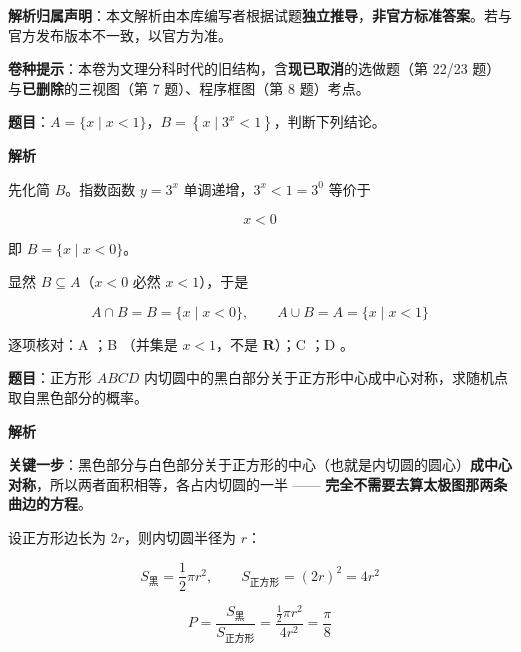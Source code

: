 

\begin{gknotice}
\textbf{ 解析归属声明}：本文解析由本库编写者根据试题\textbf{独立推导}，\textbf{非官方标准答案}。若与官方发布版本不一致，以官方为准。

\textbf{ 卷种提示}：本卷为文理分科时代的旧结构，含\textbf{现已取消}的选做题（第 22/23 题）与\textbf{已删除}的三视图（第 7 题）、程序框图（第 8 题）考点。
\end{gknotice}

\par\medskip



\textbf{题目}：$A=\{x\mid x<1\}$，$B=\left\{x\mid3^{x}<1\right\}$，判断下列结论。

\textbf{解析}

先化简 $B$。指数函数 $y=3^{x}$ 单调递增，$3^{x}<1=3^{0}$ 等价于

\[x<0\]

即 $B=\{x\mid x<0\}$。

显然 $B\subseteq A$（$x<0$ 必然 $x<1$），于是

\[A\cap B=B=\{x\mid x<0\},\qquad A\cup B=A=\{x\mid x<1\}\]

逐项核对：A ；B （并集是 $x<1$，不是 $\mathbf R$）；C ；D 。


\par\medskip


\textbf{题目}：正方形 $ABCD$ 内切圆中的黑白部分关于正方形中心成中心对称，求随机点取自黑色部分的概率。

\begin{center}\end{center}

\textbf{解析}

\textbf{关键一步}：黑色部分与白色部分关于正方形的中心（也就是内切圆的圆心）\textbf{成中心对称}，所以两者面积相等，各占内切圆的一半 —— \textbf{完全不需要去算太极图那两条曲边的方程}。

设正方形边长为 $2r$，则内切圆半径为 $r$：

\[S_{\text{黑}}=\frac12\pi r^{2},\qquad S_{\text{正方形}}=(2r)^{2}=4r^{2}\]

\[P=\frac{S_{\text{黑}}}{S_{\text{正方形}}}=\frac{\frac12\pi r^{2}}{4r^{2}}=\frac\pi8\]

